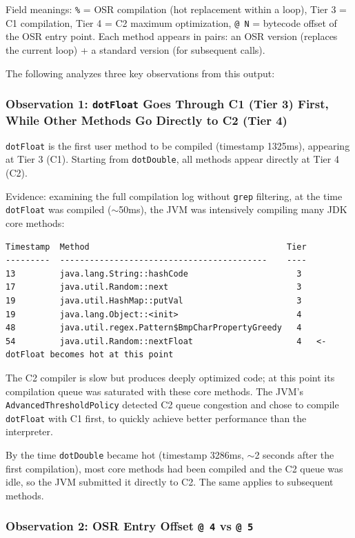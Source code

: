 \documentclass[12pt,a4paper]{article}
\begin{document}
Field meanings: \texttt{\%} = OSR compilation (hot replacement within a loop), Tier 3 = C1 compilation, Tier 4 = C2 maximum optimization, \texttt{@ N} = bytecode offset of the OSR entry point. Each method appears in pairs: an OSR version (replaces the current loop) + a standard version (for subsequent calls).

The following analyzes three key observations from this output:

\subsubsection*{Observation 1: \texttt{dotFloat} Goes Through C1 (Tier 3) First, While Other Methods Go Directly to C2 (Tier 4)}

\texttt{dotFloat} is the first user method to be compiled (timestamp 1325ms), appearing at Tier 3 (C1). Starting from \texttt{dotDouble}, all methods appear directly at Tier 4 (C2).

Evidence: examining the full compilation log without \texttt{grep} filtering, at the time \texttt{dotFloat} was compiled ($\sim$50ms), the JVM was intensively compiling many JDK core methods:

\begin{lstlisting}
Timestamp  Method                                        Tier
---------  ------------------------------------------    ----
13         java.lang.String::hashCode                      3
17         java.util.Random::next                          3
19         java.util.HashMap::putVal                       3
19         java.lang.Object::<init>                        4
48         java.util.regex.Pattern$BmpCharPropertyGreedy   4
54         java.util.Random::nextFloat                     4   <- dotFloat becomes hot at this point
\end{lstlisting}

The C2 compiler is slow but produces deeply optimized code; at this point its compilation queue was saturated with these core methods. The JVM's \texttt{AdvancedThresholdPolicy} detected C2 queue congestion and chose to compile \texttt{dotFloat} with C1 first, to quickly achieve better performance than the interpreter.

By the time \texttt{dotDouble} became hot (timestamp 3286ms, $\sim$2 seconds after the first compilation), most core methods had been compiled and the C2 queue was idle, so the JVM submitted it directly to C2. The same applies to subsequent methods.

\subsubsection*{Observation 2: OSR Entry Offset \texttt{@ 4} vs \texttt{@ 5}}
\end{document}
